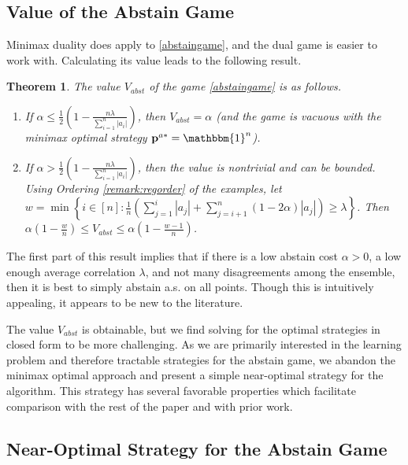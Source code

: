 \documentclass{article}[12pt]
\newtheorem{thm}{Theorem}%
\theoremstyle{named}
\newcommand{\ones}[1]{\mathbbm{1}^{#1}}
\newcommand{\vp}{\mathbf{p}}
\newcommand{\abs}[1]{\left| #1 \right|}
\newcommand{\lrp}[1]{\left(#1\right)}
\begin{document}
\subsection{Value of the Abstain Game}
\label{sec:abstgameanalysis}
Minimax duality does apply to \eqref{abstaingame}, 
and the dual game is easier to work with. 
Calculating its value leads to the following result.
\begin{thm}
\label{thm:abstgameexact}
The value $V_{abst}$ of the game \eqref{abstaingame} is as follows.
\begin{enumerate}
\item
If $\alpha \leq \frac{1}{2} \lrp{1 - \frac{n \lambda}{\sum_{i=1}^n \abs{a_i}}}$, 
then $V_{abst} = \alpha$ (and the game is vacuous with the minimax optimal strategy $\vp^{a*} = \ones{n}$).
\item
If $\alpha > \frac{1}{2} \lrp{1 - \frac{n \lambda}{\sum_{i=1}^n \abs{a_i}}}$, 
then the value is nontrivial and can be bounded. 
Using Ordering \ref{remark:regorder} of the examples, let 
$w = \min \left\{ i \in [n] : \frac{1}{n} \lrp{ \sum_{j=1}^i \abs{a_j} + \sum_{j=i+1}^n (1 - 2 \alpha) \abs{a_j} } \geq \lambda \right\}$. 
Then
$\alpha \lrp{1 - \frac{w}{n}} \leq V_{abst} \leq \alpha \lrp{1 - \frac{w-1}{n}}$.
\end{enumerate}
\end{thm}
The first part of this result implies that if there is a low abstain cost $\alpha > 0$, 
a low enough average correlation $\lambda$, and not many disagreements among the ensemble, 
then it is best to simply abstain a.s. on all points. 
Though this is intuitively appealing, it appears to be new to the literature.


The value $V_{abst}$ is obtainable, 
but we find solving for the optimal strategies in closed form to be more challenging. 
As we are primarily interested in the learning problem and therefore tractable strategies for the abstain game, 
we abandon the minimax optimal approach and present a simple near-optimal strategy for the algorithm.
This strategy has several favorable properties 
which facilitate comparison with the rest of the paper and with prior work.





\subsection{Near-Optimal Strategy for the Abstain Game}
\label{sec:heurgameanalysis}
\end{document}
